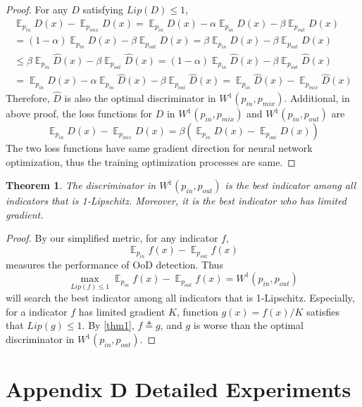 \documentclass[a3paper]{article}
\newtheorem{theorem}{Theorem}
\newtheorem*{proof}{\it{Proof.}\rm}
\newcommand{\E}{\operatorname{\mathbb{E}}}
\newcommand{\pin}{p_{in}}
\newcommand{\pout}{p_{out}}
\newcommand{\pmix}{p_{mix}}
\begin{document}
\begin{proof}
	For any $D$ satisfying $Lip(D) \leq 1$, 
	\begin{align*}
		\E_{\pin} D(x) - \E_{\pmix} D(x) = \E_{\pin} D(x) - \alpha\E_{\pin} D(x) - \beta\E_{\pout} D(x) \\ 
		= (1 - \alpha)\E_{\pin} D(x) - \beta\E_{\pout} D(x)
		= \beta \E_{\pin} D(x) - \beta \E_{\pout} D(x) \\
		\leq \beta \E_{\pin} \hat{D}(x) - \beta \E_{\pout} \hat{D}(x) = (1 - \alpha)\E_{\pin} \hat{D}(x) - \beta\E_{\pout} \hat{D}(x) \\
		= \E_{\pin} \hat{D}(x) - \alpha\E_{\pin} \hat{D}(x) - \beta\E_{\pout} \hat{D}(x) = \E_{\pin} \hat{D}(x) - \E_{\pmix} \hat{D}(x)
	\end{align*}
	Therefore, $\hat{D}$ is also the optimal discriminator in $W^1(\pin, \pmix)$. Additional, in above proof, the loss functions for $D$ in $W^1(\pin, \pmix)$ and $W^1(\pin, \pout)$ are 
	\begin{equation*}
		\E_{\pin} D(x) - \E_{\pmix} D(x) = \beta (\E_{\pin} D(x) - \E_{\pout} D(x))
	\end{equation*}
	The two loss functions have same gradient direction for neural network optimization, thus the training optimization processes are same.
\end{proof}

\begin{theorem}\label{thm9}
	The discriminator in $W^1(\pin, \pout)$ is the best indicator among all indicators that is 1-Lipschitz. Moreover, it is the best indicator who has limited gradient.
\end{theorem}
\begin{proof}
	By our simplified metric, for any indicator $f$, 
	\begin{equation*}
		\E_{\pin} f(x) - \E_{\pout} f(x)
	\end{equation*}
	measures the performance of OoD detection. Thus 
	\begin{equation*}
		\max_{Lip(f) \leq 1} \E_{\pin} f(x) - \E_{\pout} f(x) = W^1(\pin, \pout)
	\end{equation*} 
	will search the best indicator among all indicators that is 1-Lipschitz. Especially, for a indicator $f$ has limited gradient $K$, function $g(x) = f(x) / K$ satisfies that $Lip(g) \leq 1$. By \cref{thm1}, $f \triangleq g$, and $g$ is worse than the optimal discriminator in $W^1(\pin, \pout)$. 
	
\end{proof}

\section{Appendix D Detailed Experiments}





\end{document}
